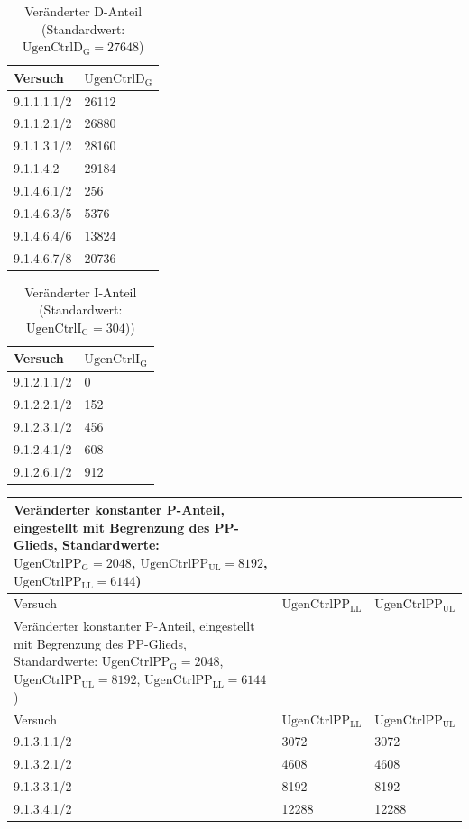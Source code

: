\begin{longtable}[]{ll}
    \caption{Veränderter D-Anteil (Standardwert: $\mathrm{UgenCtrlD_G}=27648$)}
    \label{tab:Parameter-D-Messung}
    \tabularnewline
    \toprule
    Versuch     & $\mathrm{UgenCtrlD_G}$ \\
    \midrule
    \endhead
    9.1.1.1.1/2 & 26112        \\
    9.1.1.2.1/2 & 26880        \\
    9.1.1.3.1/2 & 28160        \\
    9.1.1.4.2 & 29184        \\
    9.1.4.6.1/2 & 256          \\
    9.1.4.6.3/5 & 5376         \\
    9.1.4.6.4/6 & 13824        \\
    9.1.4.6.7/8 & 20736        \\
    \bottomrule
\end{longtable}

\begin{longtable}[]{ll}
    \caption{Veränderter I-Anteil (Standardwert: $\mathrm{UgenCtrlI_G}=304$))}
    \label{tab:Parameter-I-Messung}
    \tabularnewline
    \toprule
    Versuch     & $\mathrm{UgenCtrlI_G}$ \\
    \midrule
    \endhead
        9.1.2.1.1/2 & 0            \\
        9.1.2.2.1/2 & 152          \\
        9.1.2.3.1/2 & 456          \\
        9.1.2.4.1/2 & 608          \\
        9.1.2.6.1/2 & 912          \\
    \bottomrule
\end{longtable}

\begin{longtable}[]{lll}
    \caption{Veränderter konstanter P-Anteil, eingestellt mit Begrenzung des PP-Glieds,\\Standardwerte: $\mathrm{UgenCtrlPP_G}=2048$, $\mathrm{UgenCtrlPP_{UL}}=8192$, $\mathrm{UgenCtrlPP_{LL}}=6144$)}
    \label{tab:Parameter-P-Messung}
        \tabularnewline
    \toprule
    Versuch     & $\mathrm{UgenCtrlPP_{LL}}$ & $\mathrm{UgenCtrlPP_{UL}}$ \\
    \midrule
    \endfirsthead
    \caption{Veränderter konstanter P-Anteil, eingestellt mit Begrenzung des PP-Glieds,\\Standardwerte: $\mathrm{UgenCtrlPP_G}=2048$, $\mathrm{UgenCtrlPP_{UL}}=8192$, $\mathrm{UgenCtrlPP_{LL}}=6144$)}
    \tabularnewline
    \toprule
    Versuch     & $\mathrm{UgenCtrlPP_{LL}}$ & $\mathrm{UgenCtrlPP_{UL}}$ \\
    \midrule
    \endhead
        9.1.3.1.1/2 & 3072         & 3072  \\
        9.1.3.2.1/2 & 4608         & 4608  \\
        9.1.3.3.1/2 & 8192         & 8192  \\
        9.1.3.4.1/2 & 12288        & 12288 \\
    \bottomrule
\end{longtable}


